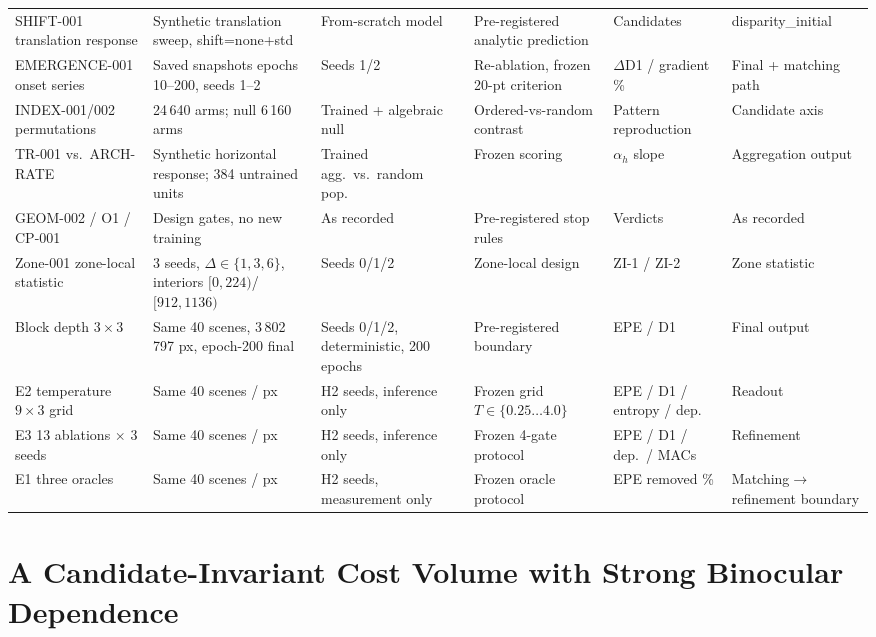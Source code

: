 \documentclass[conference]{IEEEtran}
\begin{document}
\begin{table}[t]
\begin{tabular}{p{2.6cm}p{2.2cm}p{2.6cm}p{2.4cm}p{2.2cm}p{2.2cm}}
SHIFT-001 translation response & Synthetic translation sweep, shift=none+std & From-scratch model & Pre-registered analytic prediction & Candidates & disparity\_initial \\
EMERGENCE-001 onset series & Saved snapshots epochs 10--200, seeds 1--2 & Seeds 1/2 & Re-ablation, frozen 20-pt criterion & $\Delta$D1 / gradient \% & Final + matching path \\
INDEX-001/002 permutations & 24\,640 arms; null 6\,160 arms & Trained + algebraic null & Ordered-vs-random contrast & Pattern reproduction & Candidate axis \\
TR-001 vs.\ ARCH-RATE & Synthetic horizontal response; 384 untrained units & Trained agg.\ vs.\ random pop.\ & Frozen scoring & $\alpha_h$ slope & Aggregation output \\
GEOM-002 / O1 / CP-001 & Design gates, no new training & As recorded & Pre-registered stop rules & Verdicts & As recorded \\
Zone-001 zone-local statistic & 3 seeds, $\Delta\in\{1,3,6\}$, interiors $[0,224)$/$[912,1136)$ & Seeds 0/1/2 & Zone-local design & ZI-1 / ZI-2 & Zone statistic \\
Block depth $3\times3$ & Same 40 scenes, 3\,802\,797 px, epoch-200 final & Seeds 0/1/2, deterministic, 200 epochs & Pre-registered boundary & EPE / D1 & Final output \\
E2 temperature $9\times3$ grid & Same 40 scenes / px & H2 seeds, inference only & Frozen grid $T\in\{0.25\ldots4.0\}$ & EPE / D1 / entropy / dep.\ & Readout \\
E3 13 ablations $\times$ 3 seeds & Same 40 scenes / px & H2 seeds, inference only & Frozen 4-gate protocol & EPE / D1 / dep.\ / MACs & Refinement \\
E1 three oracles & Same 40 scenes / px & H2 seeds, measurement only & Frozen oracle protocol & EPE removed \% & Matching$\to$refinement boundary \\
\bottomrule
\end{tabular}
\end{table}

\section{A Candidate-Invariant Cost Volume with Strong Binocular Dependence}
\label{sec:pillar1}
\end{document}
